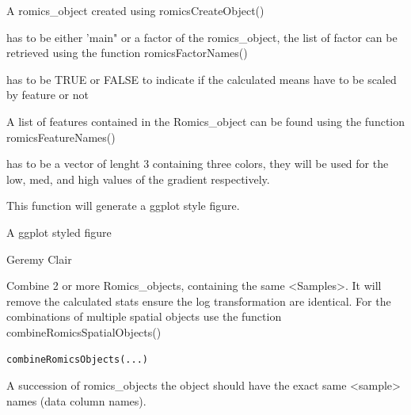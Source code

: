 \documentclass[a4paper]{book}
\begin{document}
\begin{Arguments}
\begin{ldescription}
\item[\code{romics\_object}] A romics\_object created using romicsCreateObject()

\item[\code{factor}] has to be either 'main" or a factor of the romics\_object, the list of factor can be retrieved using the function romicsFactorNames()

\item[\code{scale\_feature}] has to be TRUE or FALSE to indicate if the calculated means have to be scaled by feature or not

\item[\code{feature\_list}] A list of features contained in the Romics\_object can be found using the function romicsFeatureNames()

\item[\code{gradient\_colors}] has to be a vector of lenght 3 containing three colors, they will be used for the low, med, and high values of the gradient respectively.
\end{ldescription}
\end{Arguments}
%
\begin{Details}
This function will generate a ggplot style figure.
\end{Details}
%
\begin{Value}
A ggplot styled figure
\end{Value}
%
\begin{Author}
Geremy Clair
\end{Author}
%
\begin{Description}
Combine 2 or more Romics\_objects, containing the same <Samples>. It will remove the calculated stats ensure the log transformation are identical. For the combinations of multiple spatial objects use the function combineRomicsSpatialObjects()
\end{Description}
%
\begin{Usage}
\begin{verbatim}
combineRomicsObjects(...)
\end{verbatim}
\end{Usage}
%
\begin{Arguments}
\begin{ldescription}
\item[\code{...}] A succession of romics\_objects the object should have the exact same <sample> names (data column names).
\end{ldescription}
\end{Arguments}
\end{document}
